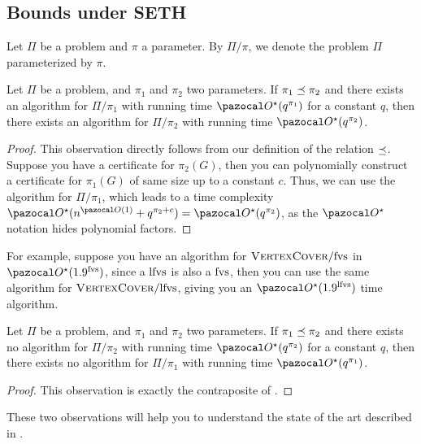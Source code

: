 \subsection{Bounds under SETH}

Let $\Pi$ be a problem and $\pi$ a parameter. By $\Pi/\pi$, we denote the problem $\Pi$ parameterized by $\pi$.

\begin{observation}
    \label{obs:upper_bound}
    Let $\Pi$ be a problem, and $\pi_1$ and $\pi_2$ two parameters. If $\pi_1 \preceq \pi_2$ and there exists an algorithm for $\Pi/\pi_1$ with running time $\O^\star(q^{\pi_1})$ for a constant $q$, then there exists an algorithm for $\Pi/\pi_2$ with running time $\O^\star(q^{\pi_2})$.
\end{observation}

\begin{proof}
    This observation directly follows from our definition of the relation $\preceq$. Suppose you have a certificate for $\pi_2(G)$, then you can polynomially construct a certificate for $\pi_1(G)$ of same size up to a constant $c$. Thus, we can use the algorithm for $\Pi/\pi_1$, which leads to a time complexity $\O^\star(n^{\O(1)} + q^{\pi_2 + c}) = \O^\star(q^{\pi_2})$, as the $\O^\star$ notation hides polynomial factors. 
\end{proof}

For example, suppose you have an algorithm for $\textsc{VertexCover}/\text{fvs}$ in $\O^\star(1.9^\fvs)$, since a $\text{lfvs}$ is also a $\text{fvs}$, then you can use the same algorithm for $\textsc{VertexCover}/\text{lfvs}$, giving you an $\O^\star(1.9^\lfvs)$ time algorithm.

\begin{observation}
    \label{obs:lower_bound}
    Let $\Pi$ be a problem, and $\pi_1$ and $\pi_2$ two parameters. If $\pi_1 \preceq \pi_2$ and there exists no algorithm for $\Pi/\pi_2$ with running time $\O^\star(q^{\pi_2})$ for a constant $q$, then there exists no algorithm for $\Pi/\pi_1$ with running time $\O^\star(q^{\pi_1})$.
\end{observation}

\begin{proof}
    This observation is exactly the contraposite of .
\end{proof}

\medskip

These two observations will help you to understand the state of the art described in .

